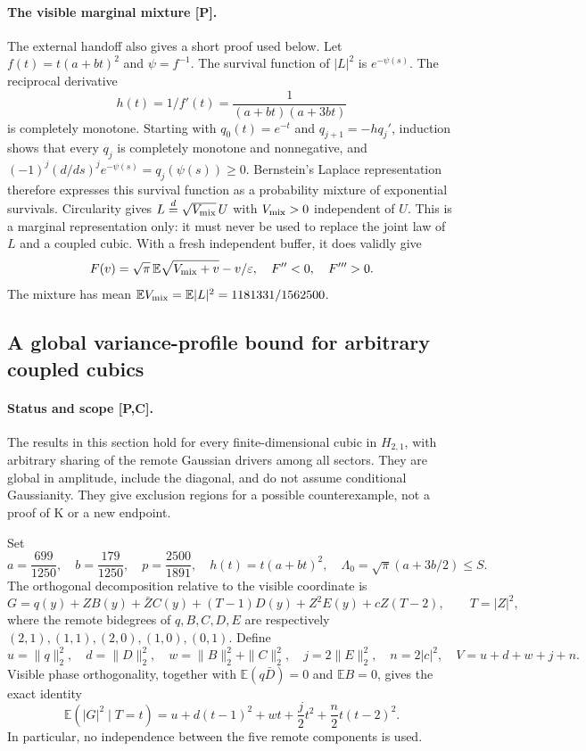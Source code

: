 \paragraph{The visible marginal mixture [P].}
The external handoff also gives a short proof used below.
Let $f(t)=t(a+bt)^2$ and $\psi=f^{-1}$. The survival function of $|L|^2$
is $e^{-\psi(s)}$. The reciprocal derivative
\[
 h(t)=1/f'(t)=\frac1{(a+bt)(a+3bt)}
\]
is completely monotone. Starting with $q_0(t)=e^{-t}$ and
$q_{j+1}=-h q_j'$, induction shows that every $q_j$ is completely monotone
and nonnegative, and
$(-1)^j(d/ds)^j e^{-\psi(s)}=q_j(\psi(s))\ge0$.
Bernstein's Laplace representation therefore expresses this survival
function as a probability mixture of exponential survivals. Circularity
gives $L\stackrel d=\sqrt{V_{\rm mix}}\,U$ with $V_{\rm mix}>0$ independent of $U$.
This is a marginal representation only: it must never be used to replace
the joint law of $L$ and a coupled cubic. With a fresh independent buffer,
it does validly give
\[
 F(v)=\sqrt\pi\,\mathbb E\sqrt{V_{\rm mix}+v}-v/\varepsilon,
 \quad F''<0,\quad F'''>0.
\]
The mixture has mean $\mathbb EV_{\rm mix}=\mathbb E|L|^2
=1181331/1562500$.
\subsection{A global variance-profile bound for arbitrary coupled cubics}
\label{sec:global-trace-profile}
\paragraph{Status and scope [P,C].}
The results in this section hold for every finite-dimensional cubic in
$H_{2,1}$, with arbitrary sharing of the remote Gaussian drivers among all
sectors. They are global in amplitude, include the diagonal, and do not assume
conditional Gaussianity. They give exclusion regions for a possible
counterexample, not a proof of K or a new endpoint.

Set
\[
a=\frac{699}{1250},\quad b=\frac{179}{1250},\quad
p=\frac{2500}{1891},\quad h(t)=t(a+bt)^2,\quad
\Lambda_0=\sqrt\pi(a+3b/2)\le S.
\]
The orthogonal decomposition relative to the visible coordinate is
\[
G=q(y)+ZB(y)+\bar ZC(y)+(T-1)D(y)+Z^2E(y)+cZ(T-2),
\qquad T=|Z|^2,
\]
where the remote bidegrees of $q,B,C,D,E$ are respectively
$(2,1),(1,1),(2,0),(1,0),(0,1)$. Define
\[
u=\|q\|_2^2,\quad d=\|D\|_2^2,\quad
w=\|B\|_2^2+\|C\|_2^2,\quad j=2\|E\|_2^2,
\quad n=2|c|^2,\quad V=u+d+w+j+n.
\]
Visible phase orthogonality, together with
$\mathbb E(q\bar D)=0$ and $\mathbb EB=0$, gives the exact identity
\begin{equation}
\mathbb E(|G|^2\mid T=t)
=u+d(t-1)^2+wt+\frac j2t^2+\frac n2t(t-2)^2.
\label{eq:trace-conditional-variance}
\end{equation}
In particular, no independence between the five remote components is used.

